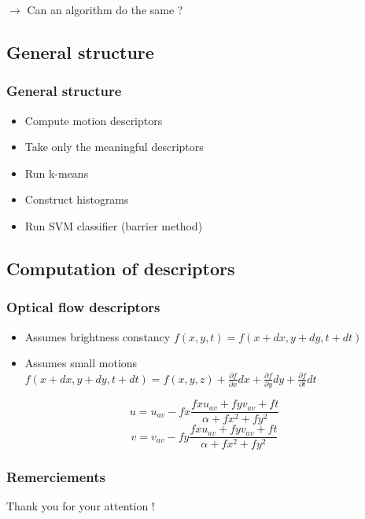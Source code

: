 \documentclass[french]{beamer}
\begin{document}
\begin{frame}
	$\rightarrow$ Can an algorithm do the same ?
	
	\end{frame}
	
	\begin{frame}
	\section{General structure}
	\frametitle{General structure}
	
	\begin{itemize}
		\item Compute motion descriptors
		\item Take only the meaningful descriptors
		\item Run k-means
		\item Construct histograms
		\item Run SVM classifier (barrier method)
	\end{itemize}
	\end{frame}
	
	
	\begin{frame}
		\section {Computation of descriptors}
		\frametitle{Optical flow descriptors}
		
		\begin{itemize}
			\item Assumes brightness constancy $f(x,y,t) = f(x+dx, y+dy, t+dt)$
			\item Assumes small motions $f(x+dx,y+dy,t+dt) = f(x,y,z) + \frac{\partial f}{\partial x}dx + \frac{\partial f}{\partial y}dy + \frac{\partial f}{\partial t}dt$
		\end{itemize}
		
		\[u = u_{av} - fx\frac{fx u_{av} + fy v_{av} + ft}{\alpha + fx^2 + fy^2}\]
		\[v = v_{av} - fy\frac{fx u_{av} + fy v_{av} + ft}{\alpha + fx^2 + fy^2}\]
	\end{frame}
	
	
	\begin{frame}
		\frametitle{}
		
	\end{frame}
	
	
	\begin{frame}
		\frametitle{}
		
	\end{frame}
	
	
	\begin{frame}
		\frametitle{}
		
	\end{frame}
	
	\begin{frame}
	\frametitle{Remerciements}
	
	Thank you for your attention !
	
	\end{frame}
\end{document}
